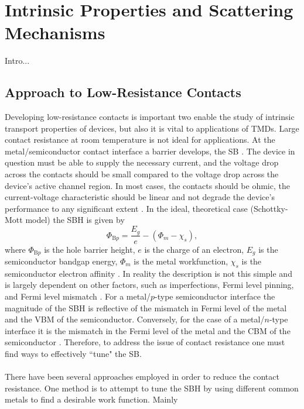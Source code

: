 \chapter{Intrinsic Properties and Scattering Mechanisms}\label{chap:results}
Intro...

\section{Approach to Low-Resistance Contacts}\label{sec:contacts}
Developing low-resistance contacts is important two enable the study of intrinsic transport properties of devices, but also it is vital to applications of \acp{TMD}. Large contact resistance at room temperature is not ideal for applications. At the metal/semiconductor contact interface a barrier develops, the \acs{SB} \cite{Schottky_ZPhys1938}. The device in question must be able to supply the necessary current, and the voltage drop across the contacts should be small compared to the voltage drop across the device's active channel region. In most cases, the contacts should be ohmic, the current-voltage characteristic should be linear and not degrade the device's performance to any significant extent \cite{Rideout_Solid1975}. In the ideal, theoretical case (Schottky-Mott model)  the \acs{SBH} is given by 
\begin{equation}
	\Phi_{\mathrm{B}p} = \frac{E_g}{e}- \left(\Phi_m - \chi_s\right),
\end{equation}
where $\Phi_{\mathrm{B}p}$ is the hole barrier height, $e$ is the charge of an electron, $E_g$ is the semiconductor bandgap energy, $\Phi_m$ is the metal workfunction, $\chi_s$ is the semiconductor electron affinity \cite{Rhoderick_Book1988}. In reality the description is not this simple and is largely dependent on other factors, such as imperfections, Fermi level pinning, and Fermi level mismatch \cite{Cohen_Book2014}. For a metal/$p$-type semiconductor interface the magnitude of the \acs{SBH} is reflective of the mismatch in Fermi level of the metal and the \ac{VBM} of the semiconductor. Conversely, for the case of a metal/$n$-type interface it is the mismatch in the Fermi level of the metal and the \ac{CBM} of the semiconductor \cite{Tung_AppPhysRev2014}. Therefore, to address the issue of contact resistance one must find ways to effectively ``tune" the \acs{SB}.\\ \\

There have been several approaches employed in order to reduce the contact resistance. One method is to attempt to tune the \acs{SBH} by using different common metals to find a desirable work function. Mainly


